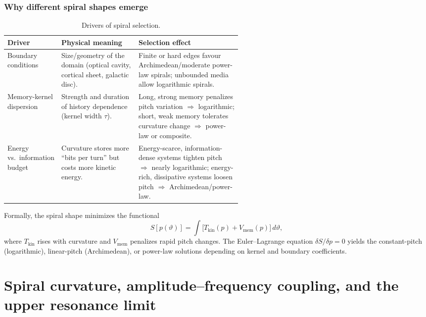 \subsubsection*{Why different spiral shapes emerge}

\begin{table}[H]
  \small
  \centering
  \caption{Drivers of spiral selection.}
  \label{tab:spiral-drivers}
  \renewcommand{\arraystretch}{1.15}
  \begin{tabularx}{\linewidth}{@{}p{0.22\linewidth} p{0.33\linewidth} X@{}}
    \toprule
    \textbf{Driver}
      & \textbf{Physical meaning}
      & \textbf{Selection effect} \\
    \midrule
    Boundary conditions
      & Size/geometry of the domain (optical cavity, cortical sheet, galactic disc).
      & Finite or hard edges favour Archimedean/moderate power-law spirals; unbounded media allow logarithmic spirals. \\
    Memory-kernel dispersion
      & Strength and duration of history dependence (kernel width \(\tau\)).
      & Long, strong memory penalizes pitch variation \(\Rightarrow\) logarithmic; short, weak memory tolerates curvature change \(\Rightarrow\) power-law or composite. \\
    Energy vs.\ information budget
      & Curvature stores more “bits per turn” but costs more kinetic energy.
      & Energy-scarce, information-dense systems tighten pitch \(\Rightarrow\) nearly logarithmic; energy-rich, dissipative systems loosen pitch \(\Rightarrow\) Archimedean/power-law. \\
    \bottomrule
  \end{tabularx}
\end{table}

Formally, the spiral shape minimizes the functional
\begin{equation}
  S[p(\vartheta)]
  = \int \bigl[T_{\mathrm{kin}}(p) + V_{\mathrm{mem}}(p)\bigr]\,d\vartheta,
\end{equation}
where \(T_{\mathrm{kin}}\) rises with curvature and \(V_{\mathrm{mem}}\) penalizes rapid pitch changes. The Euler–Lagrange equation \(\delta S/\delta p=0\) yields the constant-pitch (logarithmic), linear-pitch (Archimedean), or power-law solutions depending on kernel and boundary coefficients.

\section*{Spiral curvature, amplitude–frequency coupling, and the upper resonance limit}

